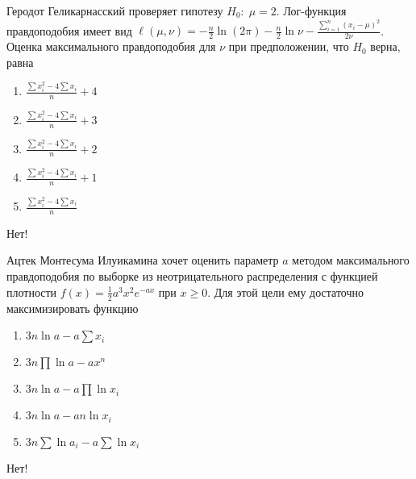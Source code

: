 \documentclass[t]{beamer}
\begin{document}
 \begin{frame} \label{51-No} 
\begin{block}{51} 

Геродот Геликарнасский проверяет гипотезу $H_0: \; \mu=2$. Лог-функция правдоподобия имеет вид $\ell(\mu,\nu)=-\frac{n}{2}\ln (2\pi)-\frac{n}{2}\ln \nu -\frac{\sum_{i=1}^n(x_i-\mu)^2}{2\nu}$. Оценка максимального правдоподобия для $\nu$ при предположении, что $H_0$ верна, равна
 


 \end{block} 
\begin{enumerate} 
\item[] \hyperlink{51-Yes}{\beamergotobutton{}$\frac{\sum x_i^2 - 4\sum x_i}{n}+4$}
\item[] \hyperlink{51-No}{\beamergotobutton{} $\frac{\sum x_i^2 - 4\sum x_i}{n}+3$}
\item[] \hyperlink{51-No}{\beamergotobutton{} $\frac{\sum x_i^2 - 4\sum x_i}{n}+2$}
\item[] \hyperlink{51-No}{\beamergotobutton{} $\frac{\sum x_i^2 - 4\sum x_i}{n}+1$}
\item[] \hyperlink{51-No}{\beamergotobutton{} $\frac{\sum x_i^2 - 4\sum x_i}{n}$}
\end{enumerate} 

 \alert{Нет!} 
\end{frame} 


 \begin{frame} \label{52-No} 
\begin{block}{52} 

Ацтек Монтесума Илуикамина хочет оценить параметр $a$ методом максимального правдоподобия по выборке из неотрицательного распределения с функцией плотности $f(x)=\frac{1}{2}a^3x^2e^{-ax}$ при $x\geq 0$. Для этой цели ему достаточно максимизировать функцию
 


 \end{block} 
\begin{enumerate} 
\item[] \hyperlink{52-Yes}{\beamergotobutton{} $3n \ln a - a \sum x_i$}
\item[] \hyperlink{52-No}{\beamergotobutton{} $3n\prod \ln a - a x^n$}
\item[] \hyperlink{52-No}{\beamergotobutton{} $3n\ln a - a \prod \ln x_i$}
\item[] \hyperlink{52-No}{\beamergotobutton{} $3n \ln a - an \ln x_i$}
\item[] \hyperlink{52-No}{\beamergotobutton{} $3n \sum \ln a_i - a \sum \ln x_i$}
\end{enumerate} 

 \alert{Нет!} 
\end{frame} 
\end{document}
